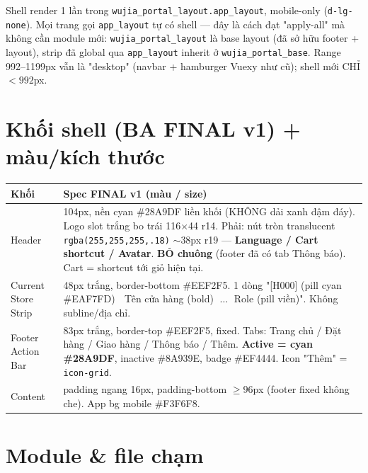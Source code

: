 Shell render 1 lần trong \texttt{wujia\_portal\_layout.app\_layout}, mobile-only
(\texttt{d-lg-none}). Mọi trang gọi \texttt{app\_layout} tự có shell --- đây là cách
đạt "apply-all" mà không cần module mới: \texttt{wujia\_portal\_layout} là base
layout (đã sở hữu footer + layout), strip đã global qua \texttt{app\_layout}
inherit ở \texttt{wujia\_portal\_base}. Range 992--1199px vẫn là "desktop"
(navbar + hamburger Vuexy như cũ); shell mới CHỈ \(<992\)px.

\section{Khối shell (BA FINAL v1) + màu/kích thước}

\begin{longtable}{@{}lp{8.8cm}@{}}
\toprule
\textbf{Khối} & \textbf{Spec FINAL v1 (màu / size)} \\
\midrule
\endhead
Header & 104px, nền cyan \#28A9DF liền khối (KHÔNG dải xanh đậm đáy). Logo slot
trắng bo trái 116\(\times\)44 r14. Phải: nút tròn translucent
\texttt{rgba(255,255,255,.18)} \(\sim\)38px r19 --- \textbf{Language / Cart
shortcut / Avatar}. \textbf{BỎ chuông} (footer đã có tab Thông báo). Cart =
shortcut tới giỏ hiện tại. \\
Current Store Strip & 48px trắng, border-bottom \#EEF2F5. 1 dòng "[H000] (pill
cyan \#EAF7FD) \(\;\) Tên cửa hàng (bold) \(\;\dots\;\) Role (pill viền)". Không
subline/địa chỉ. \\
Footer Action Bar & 83px trắng, border-top \#EEF2F5, fixed. Tabs: Trang chủ /
Đặt hàng / Giao hàng / Thông báo / Thêm. \textbf{Active = cyan \#28A9DF},
inactive \#8A939E, badge \#EF4444. Icon "Thêm" = \texttt{icon-grid}. \\
Content & padding ngang 16px, padding-bottom \(\geq 96\)px (footer fixed không
che). App bg mobile \#F3F6F8. \\
\bottomrule
\end{longtable}

\section{Module \& file chạm}

